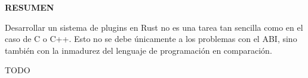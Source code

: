 
\begin{center}
{\LARGE \bfseries RESUMEN}

\vspace{2.5cm}
\end{center}

Desarrollar un sistema de plugins en Rust no es una tarea tan sencilla como en
el caso de C o C++. Esto no se debe únicamente a los problemas con el ABI, sino
también con la inmadurez del lenguaje de programación en comparación.

TODO

